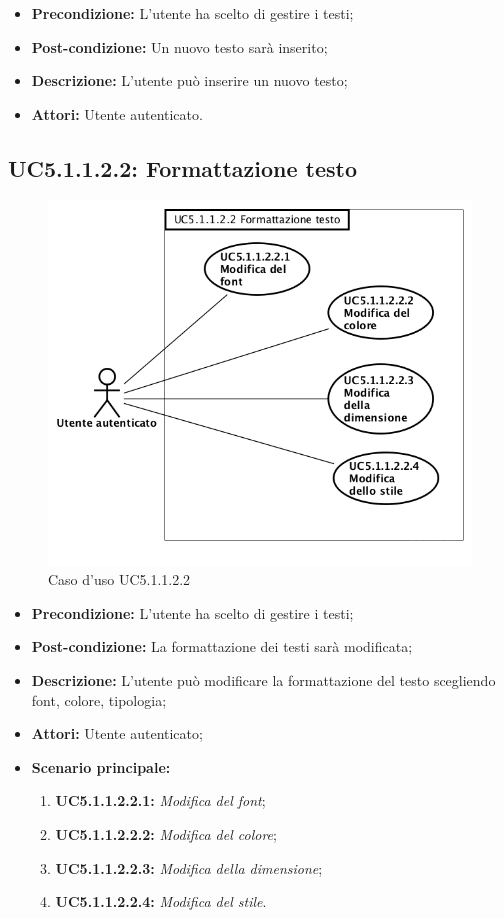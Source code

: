 \begin{itemize}
	\item \textbf{Precondizione:} L'utente ha scelto di gestire i testi;
	\item \textbf{Post-condizione:} Un nuovo testo sarà inserito;
	\item \textbf{Descrizione:} L'utente può inserire un nuovo testo;
	\item \textbf{Attori:} Utente autenticato.
\end{itemize}
\newpage
\subsection{ UC5.1.1.2.2: Formattazione testo}

\begin{figure}[h]
	\begin{center}
	\includegraphics[scale=0.4]{diagram/UC5-1-1-2-2.png}
	\caption{Caso d'uso UC5.1.1.2.2}
	\end{center}
\end{figure}
\begin{itemize}
	\item \textbf{Precondizione:} L'utente ha scelto di gestire i testi;
	\item \textbf{Post-condizione:} La formattazione dei testi sarà modificata;
	\item \textbf{Descrizione:} L'utente può modificare la formattazione del testo scegliendo font, colore, tipologia;
	\item \textbf{Attori:} Utente autenticato;
	\item \textbf{Scenario principale:}
	\begin{enumerate}
		\item \textbf{ UC5.1.1.2.2.1:} \textit{ Modifica del font};
		\item \textbf{ UC5.1.1.2.2.2:} \textit{ Modifica del colore};
		\item \textbf{ UC5.1.1.2.2.3:} \textit{ Modifica della dimensione};
		\item \textbf{ UC5.1.1.2.2.4:} \textit{ Modifica del stile}.
	\end{enumerate}
\end{itemize}
